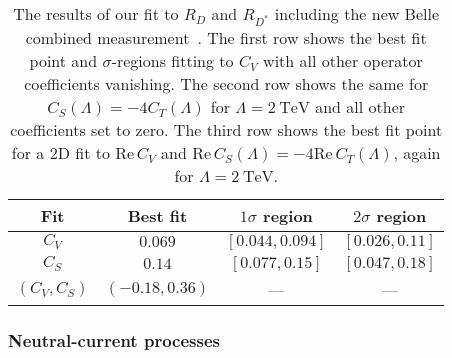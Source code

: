 \begin{table}[t]
    \centering
    \begin{tabular}{c|ccc}
      \toprule
      Fit & Best fit & $1\sigma$ region & $2\sigma$ region \\
      \midrule
      $C_{V}$  & $0.069$ & $[0.044, 0.094]$ & $[0.026, 0.11]$ \\
      $C_{S}$ & $0.14$ & $[0.077, 0.15]$ & $[0.047, 0.18]$ \\
      $(C_{V}, C_{S})$ & $(-0.18, 0.36)$ & --- & --- \\
      \bottomrule
    \end{tabular}
    \caption[The results of our fit to $R_D$ and $R_{D^*}$ including the new
    Belle combined measurement~\cite{Abdesselam:2019dgh}.]{The results of our
      fit to $R_D$ and $R_{D^*}$ including the new Belle combined
      measurement~\cite{Abdesselam:2019dgh}. The first row shows the best fit
      point and $\sigma$-regions fitting to $C_{V}$ with all other operator
      coefficients vanishing. The second row shows the same for
      $C_{S}(\Lambda) = -4 C_T(\Lambda)$ for $\Lambda = \SI{2}{\TeV}$ and all
      other coefficients set to zero. The third row shows the best fit point for
      a 2D fit to $\text{Re}\, C_{V}$ and
      $\text{Re}\, C_{S}(\Lambda)= -4 \text{Re}\, C_T(\Lambda)$, again for
      $\Lambda = \SI{2}{\TeV}$.}
    \label{tab:ch3-fitresults}
\end{table}

\subsubsection{Neutral-current processes}
\label{sec:ch3-neutralcurrentprocesses}

